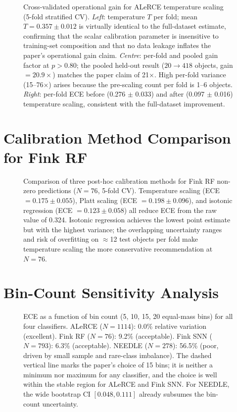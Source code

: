 \documentclass[twocolumn]{aastex631}
\begin{document}
\begin{figure}
\caption{Cross-validated operational gain for ALeRCE temperature scaling (5-fold stratified CV). \emph{Left}: temperature $T$ per fold; mean $T = 0.357 \pm 0.012$ is virtually identical to the full-dataset estimate, confirming that the scalar calibration parameter is insensitive to training-set composition and that no data leakage inflates the paper's operational gain claim. \emph{Centre}: per-fold and pooled gain factor at $p > 0.80$; the pooled held-out result ($20 \to 418$ objects, gain $= 20.9\times$) matches the paper claim of 21$\times$. High per-fold variance (15--76$\times$) arises because the pre-scaling count per fold is 1--6 objects. \emph{Right}: per-fold ECE before (0.276 $\pm$ 0.033) and after (0.097 $\pm$ 0.016) temperature scaling, consistent with the full-dataset improvement. \label{fig:alerce_cv}}
\end{figure}


\section{Calibration Method Comparison for Fink RF} \label{app:methods}

\begin{figure}
\caption{Comparison of three post-hoc calibration methods for Fink RF non-zero predictions ($N = 76$, 5-fold CV). Temperature scaling (ECE $= 0.175 \pm 0.055$), Platt scaling (ECE $= 0.198 \pm 0.096$), and isotonic regression (ECE $= 0.123 \pm 0.058$) all reduce ECE from the raw value of 0.324. Isotonic regression achieves the lowest point estimate but with the highest variance; the overlapping uncertainty ranges and risk of overfitting on $\approx$12 test objects per fold make temperature scaling the more conservative recommendation at $N = 76$. \label{fig:fink_methods}}
\end{figure}


\section{Bin-Count Sensitivity Analysis} \label{app:bins}

\begin{figure}
\caption{ECE as a function of bin count (5, 10, 15, 20 equal-mass bins) for all four classifiers. ALeRCE ($N = 1114$): 0.0\% relative variation (excellent). Fink RF ($N = 76$): 9.2\% (acceptable). Fink SNN ($N = 793$): 6.3\% (acceptable). NEEDLE ($N = 278$): 56.5\% (poor, driven by small sample and rare-class imbalance). The dashed vertical line marks the paper's choice of 15 bins; it is neither a minimum nor maximum for any classifier, and the choice is well within the stable region for ALeRCE and Fink SNN. For NEEDLE, the wide bootstrap CI $[0.048, 0.111]$ already subsumes the bin-count uncertainty. \label{fig:bins}}
\end{figure}
\end{document}

